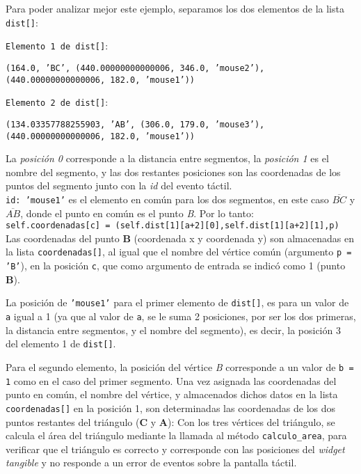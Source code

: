 Para poder analizar mejor este ejemplo, separamos los dos elementos de la lista \texttt{dist[]}:

\texttt{Elemento 1 de dist[]}:

\texttt{(164.0, 'BC', (440.00000000000006, 346.0, 'mouse2'), (440.00000000000006, 182.0, 'mouse1'))}

\texttt{Elemento 2 de dist[]}:

\texttt{(134.03357788255903, 'AB', (306.0, 179.0, 'mouse3'), (440.00000000000006, 182.0, 'mouse1'))}

La \textit{posición 0} corresponde a la distancia entre segmentos, la \textit{posición 1} es el nombre del segmento, y las dos restantes posiciones son las coordenadas de los puntos del segmento junto con la \textit{id} del evento táctil.\\

\texttt{id: 'mouse1'} es el elemento en común para los dos segmentos, en este caso $\overline{BC}$ y $\overline{AB}$, donde el punto en común es el punto \textit{B}. Por lo tanto:\\

\texttt{self.coordenadas[c] = (self.dist[1][a+2][0],self.dist[1][a+2][1],p)}\\

Las coordenadas del punto \textbf{B} (coordenada x y coordenada y) son almacenadas en la lista \texttt{coordenadas[]}, al igual que el nombre del vértice común (argumento \texttt{p = 'B'}), en la posición \texttt{c}, que como argumento de entrada se indicó como 1 (punto \textbf{B}). 

La posición de \texttt{'mouse1'} para el primer elemento de \texttt{dist[]}, es para un valor de \texttt{a} igual a 1 (ya que al valor de \texttt{a}, se le suma 2 posiciones, por ser los dos primeras, la distancia entre segmentos, y el nombre del segmento), es decir, la posición 3 del elemento 1 de \texttt{dist[]}.

Para el segundo elemento, la posición del vértice \textit{B} corresponde a un valor de \texttt{b = 1} como en el caso del primer segmento.
Una vez asignada las coordenadas del punto en común, el nombre del vértice, y almacenados dichos datos en la lista \texttt{coordenadas[]} en la posición 1, son determinadas las coordenadas de los dos puntos restantes del triángulo (\textbf{C} y \textbf{A}): 
Con los tres vértices del triángulo, se calcula el área del triángulo mediante la llamada al método \texttt{calculo\_area}, para verificar que el triángulo es correcto y corresponde con las posiciones del \emph{widget tangible} y no responde a un error de eventos sobre la pantalla táctil.

